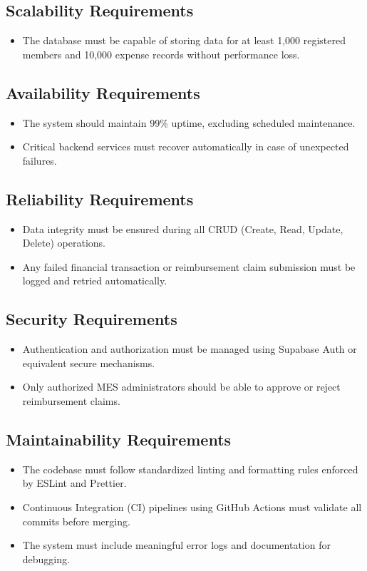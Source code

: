 \documentclass[12pt]{article}
\begin{document}
    \subsection{Scalability Requirements}
    \begin{itemize}
        \item The database must be capable of storing data for at least 1,000 registered members and 10,000 expense records without performance loss.
    \end{itemize}

    \subsection{Availability Requirements}
    \begin{itemize}
        \item The system should maintain 99\% uptime, excluding scheduled maintenance.
        \item Critical backend services must recover automatically in case of unexpected failures.
    \end{itemize}

    \subsection{Reliability Requirements}
    \begin{itemize}
        \item Data integrity must be ensured during all CRUD (Create, Read, Update, Delete) operations.
        \item Any failed financial transaction or reimbursement claim submission must be logged and retried automatically.
    \end{itemize}

    \subsection{Security Requirements}
    \begin{itemize}
        \item Authentication and authorization must be managed using Supabase Auth or equivalent secure mechanisms.
        \item Only authorized MES administrators should be able to approve or reject reimbursement claims.
    \end{itemize}

    \subsection{Maintainability Requirements}
    \begin{itemize}
        \item The codebase must follow standardized linting and formatting rules enforced by ESLint and Prettier.
        \item Continuous Integration (CI) pipelines using GitHub Actions must validate all commits before merging.
        \item The system must include meaningful error logs and documentation for debugging.
    \end{itemize}
\end{document}
